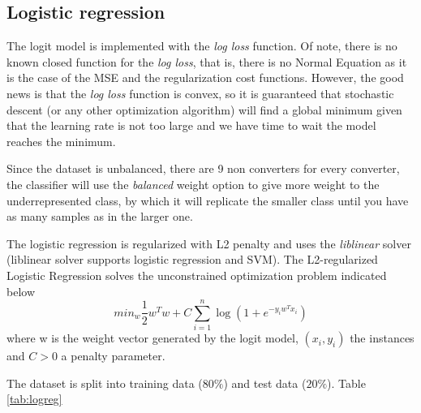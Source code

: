\documentclass[11pt]{article}
\theoremstyle{definition}
\theoremstyle{remark}
\begin{document}
{%


\subsection{Logistic regression}
\label{se:reslogreg}

The logit model is implemented with the \emph{log loss} function. Of note, there is no known closed function for the \emph{log loss}, that is, there is no Normal Equation as it is the case of the MSE and the regularization cost functions. However, the good news is that the \emph{log loss} function is convex, so it is guaranteed that stochastic descent (or any other optimization algorithm)  will find a global minimum given that the learning rate is not too large and we have time to wait the model reaches the minimum.

Since the dataset is unbalanced, there are 9 non converters for every converter, the classifier will use the \emph{balanced} weight option to give more weight to the underrepresented class, by which it will replicate the smaller class until you have as many samples as in the larger one. 

The logistic regression is regularized with L2 penalty and uses the \emph{liblinear} solver (liblinear solver supports logistic regression and SVM). 
The L2-regularized Logistic Regression solves the unconstrained optimization problem indicated below \cite{fan2008liblinear}
\begin{equation}
\textit{min}_{w} \frac{1}{2}w^Tw + C \sum_{i=1}^{n}\log(1+ e^{-y_iw^Tx_i})
\end{equation}
where w is the weight vector generated by the logit model, $(x_i,y_i)$ the instances and $C > 0$ a penalty parameter.

The dataset is split into training data ($80\%$) and test data ($20\%$). Table \ref{tab:logreg}

}
\end{document}
